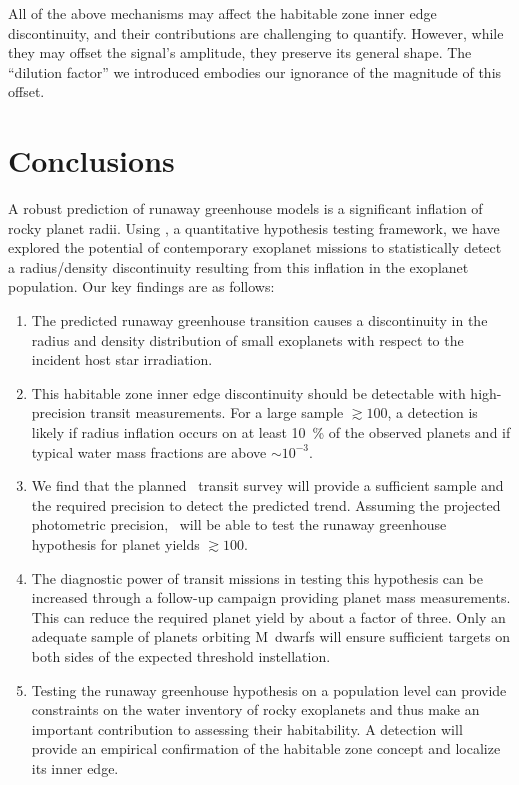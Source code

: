 \documentclass[twocolumn,twocolappendix]{aastex631}
\begin{document}
All of the above mechanisms may affect the habitable zone inner edge discontinuity, and their contributions are challenging to quantify.
However, while they may offset the signal's amplitude, they preserve its general shape.
The ``dilution factor'' we introduced embodies our ignorance of the magnitude of this offset.


\section{Conclusions}\label{sec:conclusions}
A robust prediction of runaway greenhouse models is a significant inflation of rocky planet radii.
Using \bioverse, a quantitative hypothesis testing framework, we have explored the potential of contemporary exoplanet missions to statistically detect a radius/density discontinuity resulting from this inflation in the exoplanet population.
Our key findings are as follows:
\begin{enumerate}
    \item The predicted runaway greenhouse transition causes a discontinuity in the radius and density distribution of small exoplanets with respect to the incident host star irradiation.
    \item This habitable zone inner edge discontinuity should be detectable with high-precision transit measurements.
          For a large sample $\gtrsim 100$, a detection is likely if radius inflation occurs on at least \SI{10}{\percent} of the observed planets and if typical water mass fractions are above $\sim 10^{-3}$.
    \item We find that the planned \plato\ transit survey will provide a sufficient sample and the required precision to detect the predicted trend.
          Assuming the projected photometric precision, \plato\ will be able to test the runaway greenhouse hypothesis for planet yields $\gtrsim 100$.
    \item The diagnostic power of transit missions in testing this hypothesis can be increased through a follow-up campaign providing planet mass measurements.
          This can reduce the required planet yield by about a factor of three.
          Only an adequate sample of planets orbiting M~dwarfs will ensure sufficient targets on both sides of the expected threshold instellation.
    \item Testing the runaway greenhouse hypothesis on a population level can provide constraints on the water inventory of rocky exoplanets and thus make an important contribution to assessing their habitability.
         A detection will provide an empirical confirmation of the habitable zone concept and localize its inner edge.

\end{enumerate}
\end{document}
